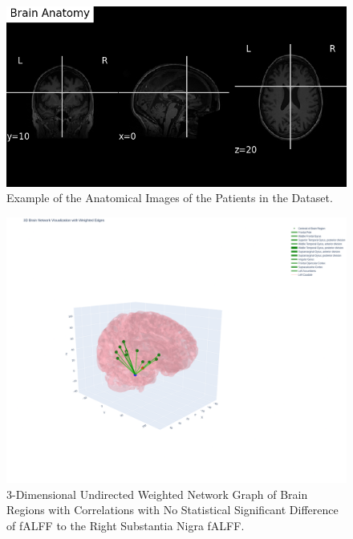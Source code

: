 \documentclass[12pt]{article}
\begin{document}
\begin{figure}[h]  %
    \centering
    \includegraphics[width=\textwidth]{"../img/anatomy.png"}  %
    \caption{Example of the Anatomical Images of the Patients in the Dataset.}
    \label{fig:anatomy}  %
\end{figure}

\begin{figure}[h]  %
    \centering
    \includegraphics[width=\textwidth]{"../img/3D_Plot_of_Correlated_fALFF.png"}  %
    \caption{3-Dimensional Undirected Weighted Network Graph of Brain Regions with Correlations with No Statistical Significant Difference of fALFF to the Right Substantia Nigra fALFF.}
    \label{fig:3D}  %
\end{figure}
\end{document}
